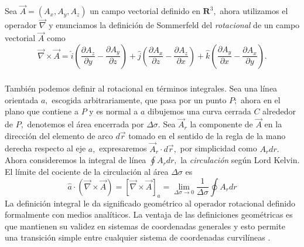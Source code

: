 \documentclass{article}
\theoremstyle{definition} \newtheorem{defi}{Definici\'on}
\theoremstyle{definition} \newtheorem{teo}{Teorema}
\theoremstyle{definition} \newtheorem{cor}{Corolario}
\begin{document}
Sea $\vec A =(A_x,A_y,A_z)$ un campo vectorial definido en $\mathbf{R}^3,$ ahora utilizamos el operador $\vec \nabla$ y enunciamos la definici\'on de Sommerfeld \cite{AS2} del \emph{rotacional} de un campo vectorial $\vec A$ como
\begin{equation}
\vec \nabla \times \vec A = \hat{i}\left(\frac{\partial A_z}{\partial y}-\frac{\partial A_y}{\partial z}\right)+\hat{j}\left(\frac{\partial A_x}{\partial z}-\frac{\partial A_z}{\partial x}\right)+\hat{k}\left(\frac{\partial A_y}{\partial x}-\frac{\partial A_x}{\partial y}\right).
\end{equation}
\subparagraph{}
Tambi\'en podemos definir al rotacional en t\'erminos integrales. Sea una l\'inea orientada $a,$ escogida arbitrariamente, que pasa por un punto $P;$ ahora en el plano que contiene a $P$ y es normal a $a$ dibujemos una curva cerrada $C$ alrededor de $P,$ denotemos el \'area encerrada por $\Delta \sigma.$ Sea $\vec A_r$ la componente de $\vec A$ en la direcci\'on del elemento de arco $d\vec r$ tomado en el sentido de la regla de la mano derecha respecto al eje $a,$ expresaremos $\vec A_r \cdot d\vec r,$ por simplicidad como $A_rdr.$ Ahora consideremos la integral de l\'inea $\oint A_r dr,$ la \emph{circulaci\'on} seg\'un Lord Kelvin. El l\'imite del cociente de la circulaci\'on al \'area $\Delta \sigma$ es
\begin{equation}
\hat{a} \cdot (\vec \nabla \times \vec A) = [\vec \nabla \times \vec A]_a = \lim_{\Delta \sigma \rightarrow 0}\frac{1}{\Delta \sigma}\oint A_r dr
\end{equation}
La definici\'on integral le da significado geom\'etrico al operador rotacional definido formalmente con medios anal\'iticos. La ventaja de las definiciones geom\'etricas es que mantienen su validez en sistemas de coordenadas generales y esto permite una transici\'on simple entre cualquier sistema de coordenadas curvil\'ineas \cite{AS2}.
\end{document}
